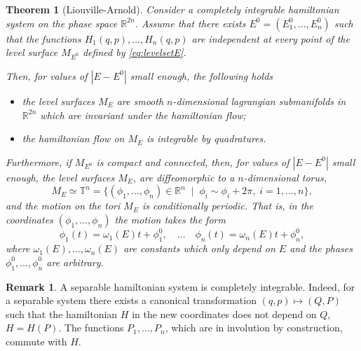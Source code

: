 \documentclass[english,fontsize=11pt,paper=b5]{scrbook}
\newtheorem{theorem}{Theorem}[chapter]
\theoremstyle{definition}
\newtheorem{remark}{Remark}[chapter]
\begin{document}
      \begin{theorem}[Liouville-Arnold]\label{thm:liouvillearnold}
        Consider a completely integrable hamiltonian system on the phase space $\mathbb{R}^{2n}$.
        Assume that there exists $E^0 = (E^0_1, \ldots, E^0_n)$ such that the functions $H_1(q,p), \ldots, H_n(q,p)$ are independent at every point of the level surface $M_{E^0}$ defined by \eqref{eq:levelsetE}.

        Then, for values of $|E-E^0|$ small enough, the following holds
        \begin{itemize}
          \item the level surfaces $M_E$ are smooth $n$-dimensional lagrangian submanifolds in $\mathbb{R}^{2n}$ which are invariant under the hamiltonian flow;
          \item the hamiltonian flow on $M_E$ is integrable by quadratures.
        \end{itemize}

        Furthermore, if $M_{E^0}$ is compact and connected, then, for values of $|E-E^0|$ small enough, the level surfaces $M_E$,  are diffeomorphic to a $n$-dimensional torus,
        \begin{equation}\label{eq:idtorusstd}
          M_E \simeq \mathbb{T}^n = \big\{ (\phi_1, \ldots, \phi_n)\in\mathbb{R}^n \;\mid\; \phi_i \sim \phi_i+2\pi, \; i=1,\ldots,n \big\},
        \end{equation}
        and the motion on the tori $M_E$ is \emph{conditionally periodic}. That is, in the coordinates $(\phi_1, \ldots, \phi_n)$ the motion takes the form
        \begin{equation}\label{eq:condperflow}
          \phi_1(t) = \omega_1(E) t + \phi_1^0,
          \quad\ldots\quad
          \phi_n(t) = \omega_n(E) t + \phi_n^0,
        \end{equation}
        where $\omega_1(E),\ldots,\omega_n(E)$ are constants which only depend on $E$ and the phases $\phi_1^0,\ldots,\phi_n^0$ are arbitrary.
      \end{theorem}

      \begin{remark}
        A separable hamiltonian system is completely integrable.
        Indeed, for a separable system there exists a canonical transformation $(q,p) \mapsto (Q,P)$ such that the hamiltonian $H$ in the new coordinates does not depend on $Q$, $H=H(P)$.
        The functions $P_1, \ldots, P_n$, which are in involution by construction, commute with $H$.
      \end{remark}
\end{document}
